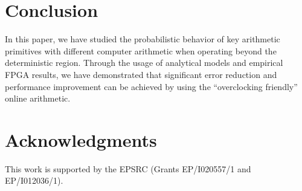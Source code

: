 \documentclass{acm_proc_article-sp}
\begin{document}
\section{Conclusion}
In this paper, we have studied the probabilistic behavior of key arithmetic primitives with different computer arithmetic when operating beyond the deterministic region. Through the usage of analytical models and empirical FPGA results, we have demonstrated that significant error reduction and performance improvement can be achieved by using the ``overclocking friendly'' online arithmetic.


\section{Acknowledgments}
This work is supported by the EPSRC (Grants EP/I020557/1 and EP/I012036/1).
%

%
\end{document}
